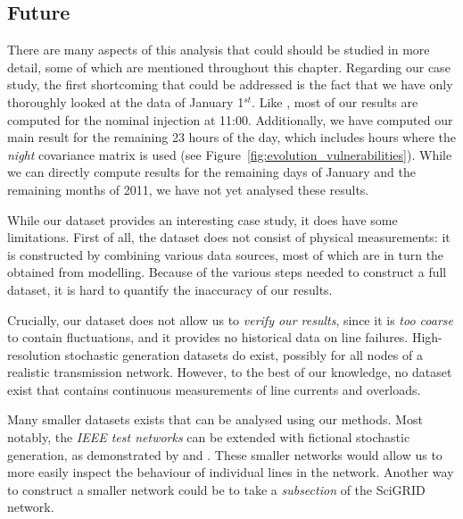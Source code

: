 \documentclass[main.tex]{subfiles}
\begin{document}
\subsection{Future}
There are many aspects of this analysis that could should be studied in more detail, some of which are mentioned throughout this chapter. Regarding our case study, the first shortcoming that could be addressed is the fact that we have only thoroughly looked at the data of January 1$^{st}$. Like \cite{Nesti2018emergentfailures}, most of our results are computed for the nominal injection at 11:00. Additionally, we have computed our main result for the remaining 23 hours of the day, which includes hours where the \emph{night} covariance matrix is used (see Figure~\ref{fig:evolution_vulnerabilities}). 
While we can directly compute results for the remaining days of January and the remaining months of 2011, we have not yet analysed these results.

While our dataset provides an interesting case study, it does have some limitations. First of all, the dataset does not consist of physical measurements: it is constructed by combining various data sources, most of which are in turn the obtained from modelling. Because of the various steps needed to construct a full dataset, it is hard to quantify the inaccuracy of our results. 

Crucially, our dataset does not allow us to \emph{verify our results}, since it is \emph{too coarse} to contain fluctuations, and it provides no historical data on line failures. High-resolution stochastic generation datasets do exist, possibly for all nodes of a realistic transmission network. However, to the best of our knowledge, no dataset exist that contains continuous measurements of line currents and overloads. 

Many smaller datasets exists that can be analysed using our methods. Most notably, the \emph{IEEE test networks} can be extended with fictional stochastic generation, as demonstrated by \cite{Nesti2018emergentfailures} and \cite{Chertkov2011}. These smaller networks would allow us to more easily inspect the behaviour of individual lines in the network. Another way to construct a smaller network could be to take a \emph{subsection} of the SciGRID network.




\clearpage
\end{document}

